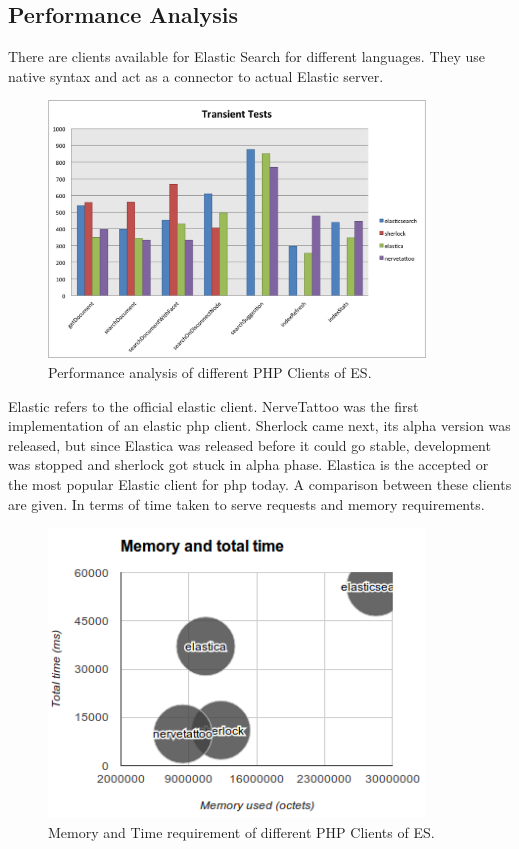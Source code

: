 \documentclass[12pt]{article}
\begin{document}
		\subsection{Performance Analysis}
			There are clients available for Elastic Search for different languages. They use native syntax and act as a connector to actual Elastic server.


			\begin{figure}[ht]
				\centering\includegraphics[width=10cm]{images/clients}
				\caption{Performance analysis of different PHP Clients of ES.}
			\end{figure}

			Elastic refers to the official elastic client. NerveTattoo was the first implementation of an elastic \ac{php} client. Sherlock came next, its alpha version was released, but since Elastica was released before it could go stable, development was stopped and sherlock got stuck in alpha phase. Elastica is the accepted or the most popular Elastic client for \ac{php} today\cite{memorybenchmark}. A comparison between these clients are given. In terms of time taken to serve requests\cite{benchmark} and memory requirements.

			\begin{figure}[ht]
				\centering\includegraphics[width=10cm]{images/clients_memory}
				\caption{Memory and Time requirement of different PHP Clients of ES.}
			\end{figure}

	\newpage
	
	
\end{document}
